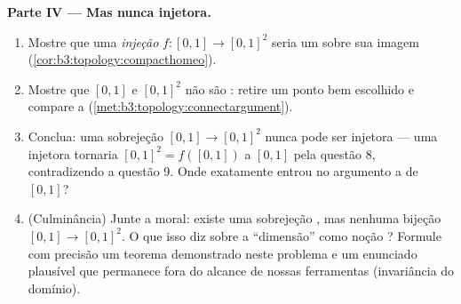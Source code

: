 \begin{problem}
\medskip
\noindent\textbf{Parte IV --- Mas nunca injetora.}
\begin{enumerate}[resume]
  \item Mostre que uma \emph{injeção}  $f \colon [0,1]
        \to [0,1]^2$ seria um
         sobre sua imagem (\cref{cor:b3:topology:compacthomeo}).
  \item Mostre que $[0,1]$ e $[0,1]^2$ não são : retire um
        ponto bem escolhido e compare a  (\cref{met:b3:topology:connectargument}).
  \item Conclua: uma sobrejeção  $[0,1] \to [0,1]^2$ nunca pode ser injetora
        --- uma injetora tornaria $[0,1]^2 = f([0,1])$  a $[0,1]$ pela
        questão 8, contradizendo a questão 9. Onde exatamente entrou no
        argumento a  de $[0,1]$?
  \item (Culminância) Junte a moral: existe uma sobrejeção ,
        mas nenhuma bijeção  $[0,1] \to
        [0,1]^2$. O que isso diz sobre a
        ``dimensão'' como noção ? Formule com precisão um
        teorema demonstrado neste problema e um enunciado plausível que
        permanece fora do alcance de nossas ferramentas (invariância do
        domínio).
\end{enumerate}


\end{problem}
